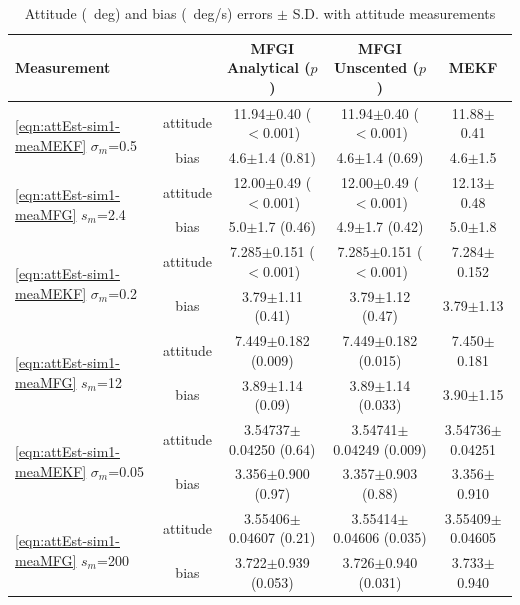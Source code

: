 \begin{table}
	\centering
	\caption{Attitude (\SI{}{deg}) and bias (\SI{}{deg/\second}) errors $\pm$ S.D. with attitude measurements \label{tab:attEst-sim1-error}}
	\footnotesize
	\begin{tabular}{l|c|ccc}
		Measurement &  & MFGI Analytical ($p$) & MFGI Unscented ($p$) & MEKF \\ \hline \hline
		\multirow{2}{*}{\eqref{eqn:attEst-sim1-meaMEKF} $\sigma_m$=0.5} & attitude & 11.94$\pm$0.40 ($<$0.001) & 11.94$\pm$0.40 ($<$0.001) & 11.88$\pm$0.41 \\
		& bias & 4.6$\pm$1.4 (0.81) & 4.6$\pm$1.4 (0.69) & 4.6$\pm$1.5 \\ \hline
		\multirow{2}{*}{\eqref{eqn:attEst-sim1-meaMFG} $s_m$=2.4} & attitude & 12.00$\pm$0.49 ($<$0.001) & 12.00$\pm$0.49 ($<$0.001) & 12.13$\pm$0.48 \\
		& bias & 5.0$\pm$1.7 (0.46) & 4.9$\pm$1.7 (0.42) & 5.0$\pm$1.8 \\ \hline \hline
		\multirow{2}{*}{\eqref{eqn:attEst-sim1-meaMEKF} $\sigma_m$=0.2} & attitude & 7.285$\pm$0.151 ($<$0.001) & 7.285$\pm$0.151 ($<$0.001) & 7.284$\pm$0.152 \\
		& bias & 3.79$\pm$1.11 (0.41) & 3.79$\pm$1.12 (0.47) & 3.79$\pm$1.13 \\ \hline
		\multirow{2}{*}{\eqref{eqn:attEst-sim1-meaMFG} $s_m$=12} & attitude & 7.449$\pm$0.182 (0.009) & 7.449$\pm$0.182 (0.015) & 7.450$\pm$0.181 \\
		& bias & 3.89$\pm$1.14 (0.09) & 3.89$\pm$1.14 (0.033) & 3.90$\pm$1.15 \\ \hline \hline
		\multirow{2}{*}{\eqref{eqn:attEst-sim1-meaMEKF} $\sigma_m$=0.05} & attitude & 3.54737$\pm$0.04250 (0.64) & 3.54741$\pm$0.04249 (0.009) & 3.54736$\pm$0.04251 \\
		& bias & 3.356$\pm$0.900 (0.97) & 3.357$\pm$0.903 (0.88) & 3.356$\pm$0.910 \\ \hline
		\multirow{2}{*}{\eqref{eqn:attEst-sim1-meaMFG} $s_m$=200} & attitude & 3.55406$\pm$0.04607 (0.21) & 3.55414$\pm$0.04606 (0.035) & 3.55409$\pm$0.04605 \\
		& bias & 3.722$\pm$0.939 (0.053) & 3.726$\pm$0.940 (0.031) & 3.733$\pm$0.940 \\ \hline \hline
	\end{tabular}
\end{table}


